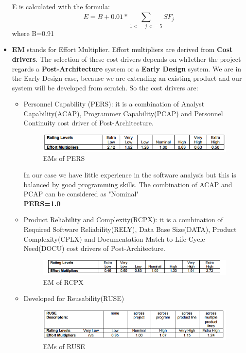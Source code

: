 \begin{itemize}
E is calculated with the formula:
\begin{equation}
E = B + 0.01 * \sum_{1<=j<=5}^{} SF_{j}
\end{equation}
where B=0.91

\item\textbf{EM} stands for Effort Multiplier. Effort multipliers are derived from \textbf{Cost drivers}. The selection of these cost drivers depends on wh1ether the project regards a \textbf{Post-Architecture} system or a \textbf{Early Design} system. We are in the Early Design case, because we are extending an existing product and our system will be developed from scratch. So the cost drivers are:
\begin{itemize}[label = {-}]
\item {Personnel Capability (PERS): it is a combination of Analyst Capability(ACAP), Programmer Capability(PCAP) and Personnel Continuity cost driver of Post-Architecture.
\begin{figure}[H]	
	\centering
	\includegraphics[scale = 0.6]{img/PERS.png}
	\caption{EMs of PERS}
\end{figure}


In our case we have little experience in the software analysis but this is balanced by good programming skills. The combination of ACAP and PCAP can be considered as "Nominal"
\\
\textbf{PERS=1.0}


}
\item Product Reliability and Complexity(RCPX): it is a combination of Required Software Reliability(RELY), Data Base Size(DATA), Product Complexity(CPLX) and Documentation Match to Life-Cycle Need(DOCU) cost drivers of Post-Architecture. 
\begin{figure}[H]	
	\centering
	\includegraphics[scale = 0.6]{img/RCPX.png}
	\caption{EM of RCPX}
\end{figure}
\item Developed for Reusability(RUSE)
\begin{figure}[H]	
	\centering
	\includegraphics[scale = 0.6]{img/RUSE.png}
	\caption{EMs of RUSE}
\end{figure}



\end{itemize}
\end{itemize}
